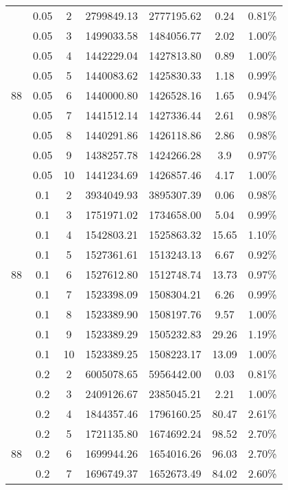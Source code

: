 {\begin{longtable}{cccrrcc}
        & 0.05  & 2     & 2799849.13 & 2777195.62 & 0.24  & 0.81\% \\
        & 0.05  & 3     & 1499033.58 & 1484056.77 & 2.02  & 1.00\% \\
        & 0.05  & 4     & 1442229.04 & 1427813.80 & 0.89  & 1.00\% \\
        & 0.05  & 5     & 1440083.62 & 1425830.33 & 1.18  & 0.99\% \\
  88    & 0.05  & 6     & 1440000.80 & 1426528.16 & 1.65  & 0.94\% \\
        & 0.05  & 7     & 1441512.14 & 1427336.44 & 2.61  & 0.98\% \\
        & 0.05  & 8     & 1440291.86 & 1426118.86 & 2.86  & 0.98\% \\
        & 0.05  & 9     & 1438257.78 & 1424266.28 & 3.9   & 0.97\% \\
        & 0.05  & 10    & 1441234.69 & 1426857.46 & 4.17  & 1.00\% \\
        & 0.1   & 2     & 3934049.93 & 3895307.39 & 0.06  & 0.98\% \\
        & 0.1   & 3     & 1751971.02 & 1734658.00 & 5.04  & 0.99\% \\
        & 0.1   & 4     & 1542803.21 & 1525863.32 & 15.65 & 1.10\% \\
        & 0.1   & 5     & 1527361.61 & 1513243.13 & 6.67  & 0.92\% \\
  88    & 0.1   & 6     & 1527612.80 & 1512748.74 & 13.73 & 0.97\% \\
        & 0.1   & 7     & 1523398.09 & 1508304.21 & 6.26  & 0.99\% \\
        & 0.1   & 8     & 1523389.90 & 1508197.76 & 9.57  & 1.00\% \\
        & 0.1   & 9     & 1523389.29 & 1505232.83 & 29.26 & 1.19\% \\
        & 0.1   & 10    & 1523389.25 & 1508223.17 & 13.09 & 1.00\% \\
        & 0.2   & 2     & 6005078.65 & 5956442.00 & 0.03  & 0.81\% \\
        & 0.2   & 3     & 2409126.67 & 2385045.21 & 2.21  & 1.00\% \\
        & 0.2   & 4     & 1844357.46 & 1796160.25 & 80.47 & 2.61\% \\
        & 0.2   & 5     & 1721135.80 & 1674692.24 & 98.52 & 2.70\% \\
  88    & 0.2   & 6     & 1699944.26 & 1654016.26 & 96.03 & 2.70\% \\
        & 0.2   & 7     & 1696749.37 & 1652673.49 & 84.02 & 2.60\% \\

\end{longtable}}
